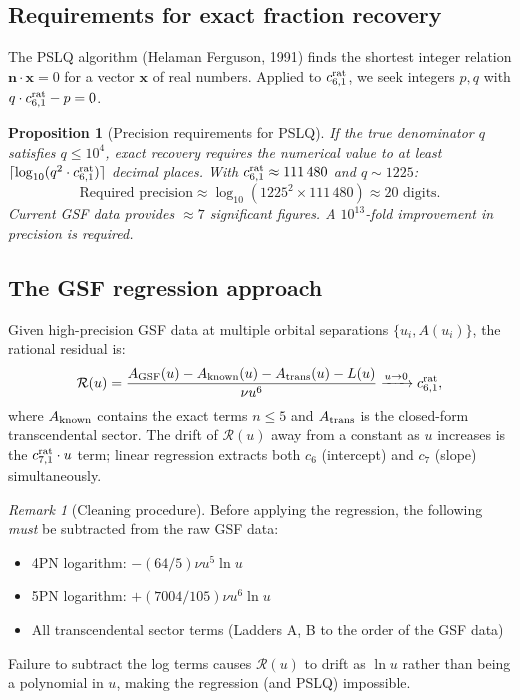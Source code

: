 \documentclass[11pt,a4paper]{article}
\theoremstyle{plain}
\newtheorem{proposition}[theorem]{Proposition}
\theoremstyle{definition}
\theoremstyle{remark}
\newtheorem{remark}[theorem]{Remark}
\begin{document}
\subsection{Requirements for exact fraction recovery}

The PSLQ algorithm (Helaman Ferguson, 1991) finds the shortest integer relation
$\mathbf{n}\cdot\mathbf{x} = 0$ for a vector $\mathbf{x}$ of real numbers.
Applied to $c_{6,1}^{\rm rat}$, we seek integers $p,q$ with $q\cdot c_{6,1}^{\rm rat} - p = 0$.

\begin{proposition}[Precision requirements for PSLQ]
If the true denominator $q$ satisfies $q \leq 10^4$, exact recovery requires
the numerical value to at least $\lceil\log_{10}(q^2\cdot c_{6,1}^{\rm rat})\rceil$
decimal places.  With $c_{6,1}^{\rm rat}\approx 111\,480$ and $q\sim1225$:
\begin{equation}
  \text{Required precision} \approx \log_{10}(1225^2 \times 111\,480) \approx 20\text{ digits}.
  \label{eq:pslq_prec}
\end{equation}
Current GSF data provides $\approx 7$ significant figures.  A $10^{13}$-fold
improvement in precision is required.
\end{proposition}

\subsection{The GSF regression approach}

Given high-precision GSF data at multiple orbital separations $\{u_i, A(u_i)\}$,
the rational residual is:
\begin{equation}
  \mathcal{R}(u) = \frac{A_{\rm GSF}(u) - A_{\rm known}(u) - A_{\rm trans}(u) - L(u)}
    {\nu u^6}
  \xrightarrow{u\to0} c_{6,1}^{\rm rat},
  \label{eq:residual}
\end{equation}
where $A_{\rm known}$ contains the exact terms $n\leq5$ and $A_{\rm trans}$ is the
closed-form transcendental sector.  The drift of $\mathcal{R}(u)$ away from a constant
as $u$ increases is the $c_{7,1}^{\rm rat}\cdot u$ term; linear regression extracts
both $c_6$ (intercept) and $c_7$ (slope) simultaneously.

\begin{remark}[Cleaning procedure]
Before applying the regression, the following \emph{must} be subtracted from
the raw GSF data:
\begin{itemize}[noitemsep]
  \item 4PN logarithm: $-(64/5)\nu u^5\ln u$
  \item 5PN logarithm: $+(7004/105)\nu u^6\ln u$
  \item All transcendental sector terms (Ladders A, B to the order of the GSF data)
\end{itemize}
Failure to subtract the log terms causes $\mathcal{R}(u)$ to drift as $\ln u$
rather than being a polynomial in $u$, making the regression (and PSLQ) impossible.
\end{remark}
\end{document}
